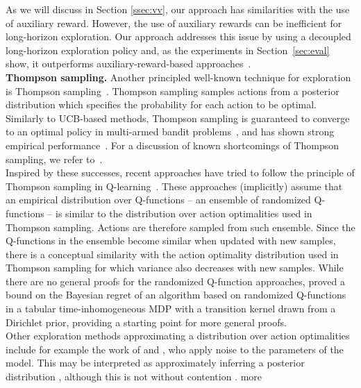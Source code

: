 \documentclass{article}
\begin{document}
As we will discuss in Section \ref{ssec:vv}, our approach has
similarities with the use of auxiliary reward. However, the
use of auxiliary rewards can be inefficient for long-horizon
exploration. Our approach addresses this issue by using a decoupled
long-horizon exploration policy and, as the experiments in
Section~\ref{sec:eval} show, it outperforms auxiliary-reward-based
approaches~\citep{strehl2008analysis}.
\\[5pt]
\textbf{Thompson sampling.}
Another principled well-known technique for exploration is
Thompson sampling~\citep{thompson1933likelihood}. Thompson sampling
samples actions from a posterior distribution which specifies the
probability for each action to be optimal. Similarly to UCB-based methods, Thompson sampling is guaranteed to converge to an optimal policy in multi-armed bandit problems~\citep{kaufmann2012thompson,agrawal2013further}, and has shown
strong empirical performance~\citep{scott2010modern,chapelle2011empirical}. For a discussion of known
shortcomings of Thompson sampling, we refer to~\citep{russo2014blearning,russo2017time,russo2018tutorial}.
\\
Inspired by these successes, recent approaches have tried to follow
the principle of Thompson sampling in
Q-learning~\citep{osband2013more,osband2019deep,deramo2019exploiting}.
These approaches (implicitly) assume that an empirical distribution
over Q-functions -- an ensemble of randomized Q-functions -- is similar to the
distribution over action optimalities used in Thompson sampling. Actions are therefore sampled from such ensemble. Since the
Q-functions in the ensemble become similar when updated with new samples,
there is a conceptual similarity with the action optimality
distribution used in Thompson sampling for which variance also
decreases with new samples. While there are no general proofs for the
randomized Q-function approaches, \citet{osband2019deep} proved a bound on the Bayesian regret of an algorithm based on
randomized Q-functions in a tabular time-inhomogeneous MDP with a
transition kernel drawn from a Dirichlet prior, providing a starting
point for more general proofs.
\\
Other exploration methods approximating a distribution over action
optimalities include for example the work of \citet{fortunato2017noisy} and \citet{plappert2018parameter}, who apply noise to the parameters of the model. This may be interpreted as approximately inferring a posterior
distribution \citep{gal2015dropout}, although this is not without contention \citep{osband2016risk}. \citet{osband2016deep} more
\end{document}
